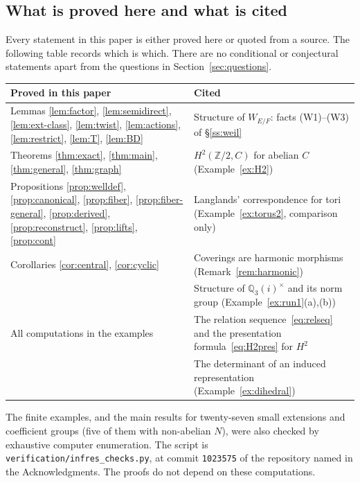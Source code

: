 \documentclass[12pt,letterpaper]{article}
\numberwithin{equation}{section}
\theoremstyle{plain}
\theoremstyle{definition}
\newcommand{\Z}{\mathbb{Z}}
\newcommand{\Q}{\mathbb{Q}}
\begin{document}
\subsection{What is proved here and what is cited}\label{ss:proved}

Every statement in this paper is either proved here or quoted from a
source. The following table records which is which. There are no
conditional or conjectural statements apart from the questions in
Section~\ref{sec:questions}.

\begin{center}
\begin{tabular}{@{}p{}p{}@{}}
\toprule
Proved in this paper & Cited \\
\midrule
Lemmas \ref{lem:factor}, \ref{lem:semidirect}, \ref{lem:ext-class},
\ref{lem:twist}, \ref{lem:actions}, \ref{lem:restrict}, \ref{lem:T},
\ref{lem:BD} &
Structure of $W_{E/F}$: facts (W1)--(W3) of \S\ref{ss:weil}
\cite{Ta79,AT68} \\
Theorems \ref{thm:exact}, \ref{thm:main}, \ref{thm:general},
\ref{thm:graph} &
$H^2(\Z/2,C)$ for abelian $C$ (Example~\ref{ex:H2}) \cite{Se79} \\
Propositions \ref{prop:welldef}, \ref{prop:canonical},
\ref{prop:fiber}, \ref{prop:fiber-general}, \ref{prop:derived},
\ref{prop:reconstruct}, \ref{prop:lifts}, \ref{prop:cont} &
Langlands' correspondence for tori (Example~\ref{ex:torus2}, comparison
only) \cite{La97} \\
Corollaries \ref{cor:central}, \ref{cor:cyclic} &
Coverings are harmonic morphisms (Remark~\ref{rem:harmonic}) \cite{BN09} \\
 & Structure of $\Q_3(i)^\times$ and its norm group
(Example~\ref{ex:run1}(a),(b)) \cite{Se79} \\
All computations in the examples & The relation sequence~\eqref{eq:relseq}
and the presentation formula~\eqref{eq:H2pres} for $H^2$ \cite{Br82} \\
 & The determinant of an induced representation
(Example~\ref{ex:dihedral}) \\
\bottomrule
\end{tabular}
\end{center}

\noindent The finite examples, and the main results for twenty-seven small
extensions and coefficient groups (five of them with non-abelian $N$),
were also checked by exhaustive computer enumeration. The script is
\texttt{verification/infres\_checks.py}, at commit \texttt{1023575} of the
repository named in the Acknowledgments. The proofs do not depend on these
computations.
\end{document}
